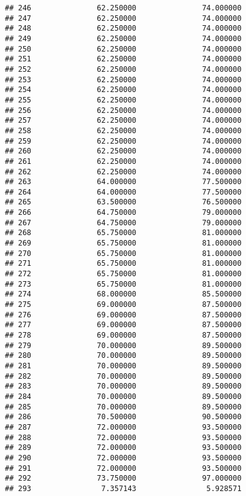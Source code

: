 \documentclass[]{article}
\begin{document}
\begin{verbatim}
## 246               62.250000               74.000000
## 247               62.250000               74.000000
## 248               62.250000               74.000000
## 249               62.250000               74.000000
## 250               62.250000               74.000000
## 251               62.250000               74.000000
## 252               62.250000               74.000000
## 253               62.250000               74.000000
## 254               62.250000               74.000000
## 255               62.250000               74.000000
## 256               62.250000               74.000000
## 257               62.250000               74.000000
## 258               62.250000               74.000000
## 259               62.250000               74.000000
## 260               62.250000               74.000000
## 261               62.250000               74.000000
## 262               62.250000               74.000000
## 263               64.000000               77.500000
## 264               64.000000               77.500000
## 265               63.500000               76.500000
## 266               64.750000               79.000000
## 267               64.750000               79.000000
## 268               65.750000               81.000000
## 269               65.750000               81.000000
## 270               65.750000               81.000000
## 271               65.750000               81.000000
## 272               65.750000               81.000000
## 273               65.750000               81.000000
## 274               68.000000               85.500000
## 275               69.000000               87.500000
## 276               69.000000               87.500000
## 277               69.000000               87.500000
## 278               69.000000               87.500000
## 279               70.000000               89.500000
## 280               70.000000               89.500000
## 281               70.000000               89.500000
## 282               70.000000               89.500000
## 283               70.000000               89.500000
## 284               70.000000               89.500000
## 285               70.000000               89.500000
## 286               70.500000               90.500000
## 287               72.000000               93.500000
## 288               72.000000               93.500000
## 289               72.000000               93.500000
## 290               72.000000               93.500000
## 291               72.000000               93.500000
## 292               73.750000               97.000000
## 293                7.357143                5.928571

\end{verbatim}
\end{document}
